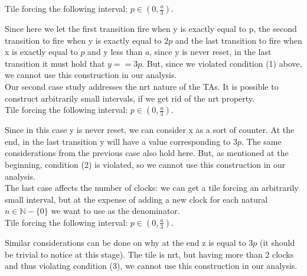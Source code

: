 \documentclass[12pt, a4paper]{article}
\begin{document}
Tile forcing the following interval: $p \in (0, \frac{a}{3})$.



\noindent
Since here we let the first transition fire when y is exactly equal to p, the second transition to fire when y is exactly equal to $2p$ and the last transition to fire when x is exactly equal to $p$ and y less than $a$, since y is never reset, in the last transition it must hold that $y == 3p$. But, since we violated condition (1) above, we cannot use this construction in our analysis.\\

\noindent
Our second case study addresses the nrt nature of the TAs. It is possible to construct arbitrarily small intervals, if we get rid of the nrt property.\\

Tile forcing the following interval: $p \in (0, \frac{a}{3})$.



\noindent
Since in this case y is never reset, we can consider x as a sort of counter. At the end, in the last transition y will have a value corresponding to $3p$. The same considerations from the previous case also hold here. But, as mentioned at the beginning, condition (2) is violated, so we cannot use this construction in our analysis.\\

\noindent
The last case affects the number of clocks: we can get a tile forcing an arbitrarily small interval, but at the expense of adding a new clock for each natural $n \in \mathbb{N}-\{0\}$ we want to use as the denominator.\\

Tile forcing the following interval: $p \in (0, \frac{a}{3})$.



\noindent
Similar considerations can be done on why at the end z is equal to $3p$ (it should be trivial to notice at this stage). The tile is nrt, but having more than 2 clocks and thus violating condition (3), we cannot use this construction in our analysis.\\
\end{document}
